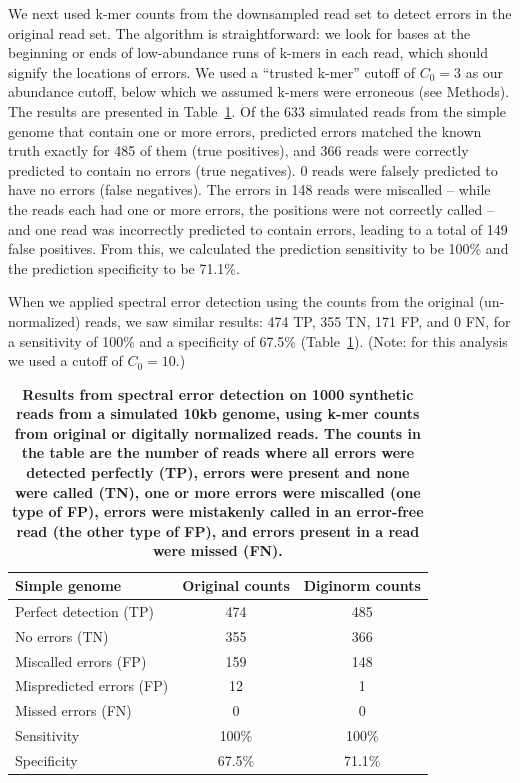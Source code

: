 \documentclass{article}
\begin{document}
We next used k-mer counts from the downsampled read set to detect
errors in the original read set.  The algorithm is straightforward: we
look for bases at the beginning or ends of low-abundance runs of
k-mers in each read, which should signify the locations of errors. We
used a ``trusted k-mer'' cutoff of $C_0 = 3$ as our abundance cutoff,
below which we assumed k-mers were erroneous (see Methods).  The
results are presented in Table~\ref{tab:a}.  Of the 633 simulated
reads from the simple genome that contain one or more errors, predicted
errors matched the known truth exactly for 485 of them (true
positives), and 366 reads were correctly predicted to contain no
errors (true negatives). 0 reads were falsely predicted to have no
errors (false negatives). The errors in 148 reads were miscalled --
while the reads each had one or more errors, the positions were not
correctly called -- and one read was incorrectly predicted to
contain errors, leading to a total of 149 false positives.  From this,
we calculated the prediction sensitivity to be 100\% and the
prediction specificity to be 71.1\%.

When we applied spectral error detection using the counts from the
original (un-normalized) reads, we saw similar results: 474 TP, 355
TN, 171 FP, and 0 FN, for a sensitivity of 100\% and a specificity of
67.5\% (Table~\ref{tab:a}).  (Note: for this analysis we used a cutoff
of $C_0=10$.)


\begin{table}
\centering

\begin{tabular}{|l|c|c|}
\hline
{\bf Simple genome} & Original counts & Diginorm counts \\
\hline
Perfect detection (TP) & 474 & 485 \\
No errors (TN) & 355 & 366 \\
Miscalled errors (FP) & 159 & 148 \\
Mispredicted errors (FP) & 12 & 1 \\
Missed errors (FN) & 0 & 0 \\
\hline
Sensitivity & 100\% & 100\% \\
Specificity & 67.5\% & 71.1\% \\
\hline
\end{tabular}

\caption{{\bf Results from spectral error detection on 1000 synthetic
    reads from a simulated 10kb genome, using k-mer counts from
    original or digitally normalized reads.  The counts in the table
    are the number of reads where all errors were detected perfectly
    (TP), errors were present and none were called (TN), one or more
    errors were miscalled (one type of FP), errors were mistakenly
    called in an error-free read (the other type of FP), and errors
    present in a read were missed (FN).}}
\label{tab:a}
\end{table}
\end{document}
